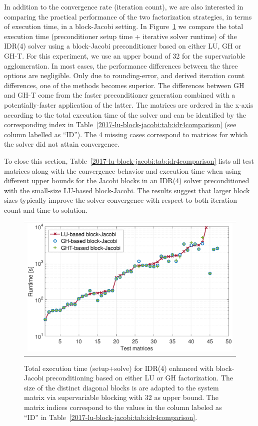 In addition to the convergence rate (iteration count), we are also interested in comparing the 
practical performance of the two factorization strategies, in terms of execution time, in a block-Jacobi setting.
In Figure~\ref{2017-lu-block-jacobi:fig:runtime} we compare the total execution time (preconditioner setup time + iterative solver runtime)
of the IDR(4) solver 
using a block-Jacobi preconditioner based on either LU, GH or GH-T.
For this experiment, we use an upper bound of 32 for the supervariable agglomeration.
In most cases, the performance differences between the three options are negligible. 
Only due to rounding-error, and derived iteration count differences, one of the methods
becomes superior. The differences between GH and GH-T come from the faster
preconditioner generation
combined with a potentially-faster application of the latter.
The matrices are ordered in the x-axis according to the total execution time of the solver
and can be identified by the corresponding index in
Table~\ref{2017-lu-block-jacobi:tab:idr4comparison} (see column labelled as ``ID''). 
The 4 missing cases correspond to matrices for which the solver did not attain convergence.

To close this section, Table~\ref{2017-lu-block-jacobi:tab:idr4comparison} 
lists all test matrices along with the convergence behavior and execution time when
using different upper bounds for the Jacobi blocks in an IDR(4) solver preconditioned with the 
small-size LU-based block-Jacobi. The results suggest that larger block sizes typically improve the solver convergence
with respect to both iteration count and time-to-solution.




\begin{figure}
\begin{center}
\begin{tabular}{c}
\includegraphics[width=.95\columnwidth]{plots/new_runtime_comparison_bs32}\\
\end{tabular}
\end{center}
\caption{
Total execution time (setup+solve) 
for IDR(4) enhanced with block-Jacobi preconditioning based on either LU or GH factorization.
The size of the distinct diagonal blocks is are adapted to the system matrix via supervariable 
blocking with 32 as upper bound. The matrix indices correspond to the values in the column 
labeled as ``ID'' in Table~\ref{2017-lu-block-jacobi:tab:idr4comparison}.
}
\label{2017-lu-block-jacobi:fig:runtime}
\end{figure}
